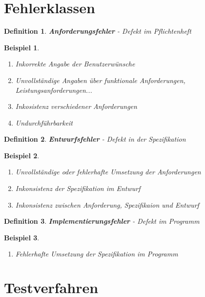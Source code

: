 \documentclass[a4paper]{article}
\theoremstyle{break}
\newtheorem{defi}{Definition}[section]
\newtheorem{ex}{Beispiel}[section]
\begin{document}
        \section{Fehlerklassen}
        \begin{defi}
          \textbf{Anforderungsfehler} - Defekt im Pflichtenheft
        \end{defi}
        \begin {ex}
          \begin{enumerate}
          \item Inkorrekte Angabe der Benutzerwünsche
          \item Unvollständige Angaben über funktionale Anforderungen, Leistungsanforderungen...
          \item Inkosistenz verschiedener Anforderungen
          \item Undurchführbarkeit
            \end{enumerate}
        \end{ex}
        \begin{defi}
          \textbf{Entwurfsfehler} - Defekt in der Spezifikation
        \end{defi}
        \begin{ex}
          \begin{enumerate}
          \item Unvollständige oder fehlerhafte Umsetzung der Anforderungen
          \item Inkonsistenz der Spezifikation im Entwurf
          \item Inkonsistenz zwischen Anforderung, Spezifikaion und Entwurf
          \end {enumerate}
          \end{ex}
        \begin {defi}
          \textbf{Implementierungsfehler} - Defekt im Programm
        \end{defi}
        \begin{ex}
          \begin{enumerate}
          \item Fehlerhafte Umsetzung der Spezifikation im Programm
          \end{enumerate}
        \end{ex}

        
        \section{Testverfahren}
\end{document}
